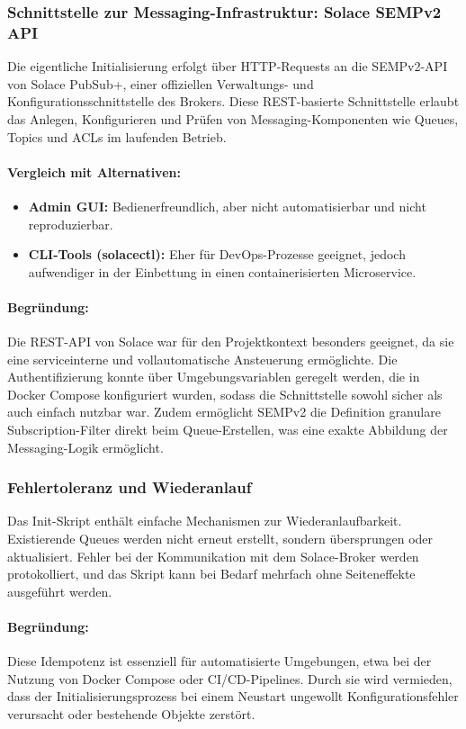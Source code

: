\subsubsection*{Schnittstelle zur Messaging-Infrastruktur: Solace SEMPv2 API}

Die eigentliche Initialisierung erfolgt \"uber HTTP-Requests an die SEMPv2-API von Solace PubSub+, einer offiziellen Verwaltungs- und Konfigurationsschnittstelle des Brokers. Diese REST-basierte Schnittstelle erlaubt das Anlegen, Konfigurieren und Pr\"ufen von Messaging-Komponenten wie Queues, Topics und ACLs im laufenden Betrieb.

\paragraph*{Vergleich mit Alternativen:}

\begin{itemize}
  \item \textbf{Admin GUI:} Bedienerfreundlich, aber nicht automatisierbar und nicht reproduzierbar.
  \item \textbf{CLI-Tools (solacectl):} Eher f\"ur DevOps-Prozesse geeignet, jedoch aufwendiger in der Einbettung in einen containerisierten Microservice.
\end{itemize}

\paragraph*{Begr\"undung:}

Die REST-API von Solace war f\"ur den Projektkontext besonders geeignet, da sie eine serviceinterne und vollautomatische Ansteuerung erm\"oglichte. Die Authentifizierung konnte \"uber Umgebungsvariablen geregelt werden, die in Docker Compose konfiguriert wurden, sodass die Schnittstelle sowohl sicher als auch einfach nutzbar war. Zudem erm\"oglicht SEMPv2 die Definition granulare Subscription-Filter direkt beim Queue-Erstellen, was eine exakte Abbildung der Messaging-Logik erm\"oglicht.

\subsubsection*{Fehlertoleranz und Wiederanlauf}

Das Init-Skript enth\"alt einfache Mechanismen zur Wiederanlaufbarkeit. Existierende Queues werden nicht erneut erstellt, sondern \"ubersprungen oder aktualisiert. Fehler bei der Kommunikation mit dem Solace-Broker werden protokolliert, und das Skript kann bei Bedarf mehrfach ohne Seiteneffekte ausgef\"uhrt werden.

\paragraph*{Begr\"undung:}

Diese Idempotenz ist essenziell f\"ur automatisierte Umgebungen, etwa bei der Nutzung von Docker Compose oder CI/CD-Pipelines. Durch sie wird vermieden, dass der Initialisierungsprozess bei einem Neustart ungewollt Konfigurationsfehler verursacht oder bestehende Objekte zerst\"ort.
